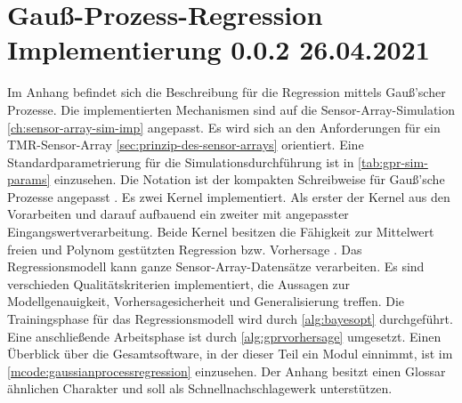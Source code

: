%

\chapter{Gauß-Prozess-Regression Implementierung 0.0.2 26.04.2021}\label{ch:gpr-imp}


Im Anhang befindet sich die Beschreibung für die Regression mittels Gauß'scher Prozesse. Die implementierten Mechanismen sind auf die Sensor-Array-Simulation \autoref{ch:sensor-array-sim-imp} angepasst. Es wird sich an den Anforderungen für ein TMR-Sensor-Array \autoref{sec:prinzip-des-sensor-arrays} orientiert. Eine Standardparametrierung für die Simulationsdurchführung ist in \autoref{tab:gpr-sim-params} einzusehen. Die Notation ist der kompakten Schreibweise für Gauß'sche Prozesse angepasst \cite{Rasmussen2006}. Es zwei Kernel implementiert. Als erster der Kernel aus den Vorarbeiten \cite{Schuethe2020b}\cite{Schuethe2020} und darauf aufbauend ein zweiter mit angepasster Eingangswertverarbeitung. Beide Kernel besitzen die Fähigkeit zur Mittelwert freien und Polynom gestützten Regression bzw. Vorhersage \cite{Rasmussen2006}. Das Regressionsmodell kann ganze Sensor-Array-Datensätze verarbeiten. Es sind verschieden Qualitätskriterien implementiert, die Aussagen zur Modellgenauigkeit, Vorhersagesicherheit und Generalisierung treffen. Die Trainingsphase für das Regressionsmodell wird durch \autoref{alg:bayesopt} durchgeführt. Eine anschließende Arbeitsphase ist durch \autoref{alg:gprvorhersage} umgesetzt. Einen Überblick über die Gesamtsoftware, in der dieser Teil ein Modul einnimmt, ist im \autoref{mcode:gaussianprocessregression} einzusehen. Der Anhang besitzt einen Glossar ähnlichen Charakter und soll als Schnellnachschlagewerk unterstützen.


